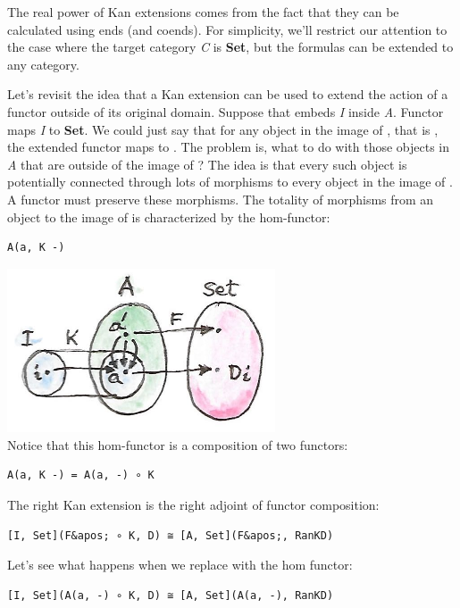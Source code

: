 The real power of Kan extensions comes from the fact that they can be
calculated using ends (and coends). For simplicity, we'll restrict our
attention to the case where the target category \emph{C} is
\textbf{Set}, but the formulas can be extended to any category.

Let's revisit the idea that a Kan extension can be used to extend the
action of a functor outside of its original domain. Suppose that
 embeds \emph{I} inside \emph{A}. Functor  maps
\emph{I} to \textbf{Set}. We could just say that for any object
 in the image of , that is , the
extended functor maps  to . The problem is, what
to do with those objects in \emph{A} that are outside of the image of
? The idea is that every such object is potentially connected
through lots of morphisms to every object in the image of . A
functor must preserve these morphisms. The totality of morphisms from an
object  to the image of  is characterized by the
hom-functor:

\begin{verbatim}
A(a, K -)
\end{verbatim}

\includegraphics[width=3.12500in]{images/kan13.jpg}\\
Notice that this hom-functor is a composition of two functors:

\begin{verbatim}
A(a, K -) = A(a, -) ∘ K
\end{verbatim}

The right Kan extension is the right adjoint of functor composition:

\begin{verbatim}
[I, Set](F&apos; ∘ K, D) ≅ [A, Set](F&apos;, RanKD)
\end{verbatim}

Let's see what happens when we replace  with the hom
functor:

\begin{verbatim}
[I, Set](A(a, -) ∘ K, D) ≅ [A, Set](A(a, -), RanKD)
\end{verbatim}

